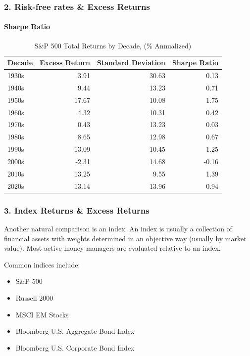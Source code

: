 \documentclass{beamer}
\begin{document}
{
\begin{frame}[t]
    \frametitle{2. Risk-free rates \& Excess Returns}
    \framesubtitle{Sharpe Ratio}
    
    \vspace{-1em}
    \scriptsize
\begin{table}
\caption{S\&P 500 Total Returns by Decade, (\% Annualized)}
\begin{tabular}{lrrr}
\toprule
Decade & Excess Return & Standard Deviation & Sharpe Ratio \\
\midrule
1930s & 3.91 & 30.63 & 0.13 \\
1940s & 9.44 & 13.23 & 0.71 \\
1950s & 17.67 & 10.08 & 1.75 \\
1960s & 4.32 & 10.31 & 0.42 \\
1970s & 0.43 & 13.23 & 0.03 \\
1980s & 8.65 & 12.98 & 0.67 \\
1990s & 13.09 & 10.45 & 1.25 \\
2000s & -2.31 & 14.68 & -0.16 \\
2010s & 13.25 & 9.55 & 1.39 \\
2020s & 13.14 & 13.96 & 0.94 \\
\bottomrule
\end{tabular}
\end{table}


\end{frame}

\begin{frame}[t]
  \frametitle{3. Index Returns \& Excess Returns}

    Another natural comparison is an index.  An index is usually a collection of financial assets with weights determined in an objective way (usually by market value).   Most active money managers are evaluated relative to an index.  
    
    \vspace{1em}
    Common indices include:
    \begin{itemize}
    \item S\&P 500
    \item Russell 2000
    \item MSCI EM Stocks
    \item Bloomberg U.S. Aggregate Bond Index
    \item Bloomberg U.S. Corporate Bond Index
    \end{itemize}


\end{frame}}
\end{document}
